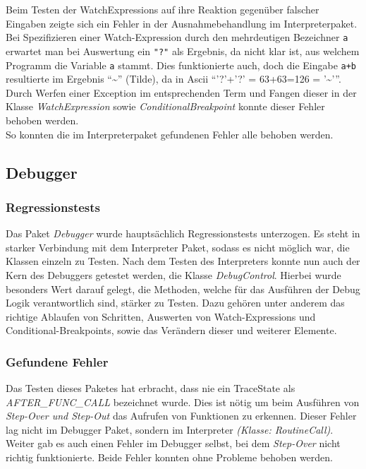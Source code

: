 \documentclass[parskip=full]{scrartcl}
\begin{document}
Beim Testen der WatchExpressions auf ihre Reaktion gegenüber falscher Eingaben zeigte sich ein Fehler in der Ausnahmebehandlung im Interpreterpaket. Bei Spezifizieren einer Watch-Expression durch den mehrdeutigen Bezeichner \texttt{a} erwartet man bei Auswertung ein \texttt{"?"} als Ergebnis, da nicht klar ist, aus welchem Programm die Variable \texttt{a} stammt. Dies funktionierte auch, doch die Eingabe \texttt{a+b} resultierte im Ergebnis \enquote{\~{}} (Tilde), da in Ascii \enquote{'?'+'?' = 63+63=126 = '\~{}'}.
Durch Werfen einer Exception im entsprechenden Term und Fangen dieser in der Klasse \textit{WatchExpression} sowie \textit{ConditionalBreakpoint} konnte dieser Fehler behoben werden.
\\
So konnten die im Interpreterpaket gefundenen Fehler alle behoben werden.

\subsection{Debugger}
\subsubsection{Regressionstests}
Das Paket \textit{Debugger} wurde hauptsächlich Regressionstests unterzogen. Es steht in starker Verbindung mit dem Interpreter Paket, sodass es nicht möglich war, die Klassen einzeln zu Testen. Nach dem Testen des Interpreters konnte nun auch der Kern des Debuggers getestet werden, die Klasse \textit{DebugControl}. Hierbei wurde besonders Wert darauf gelegt, die Methoden, welche für das Ausführen der Debug Logik verantwortlich sind, stärker zu Testen. Dazu gehören unter anderem das richtige Ablaufen von Schritten, Auswerten von Watch-Expressions und Conditional-Breakpoints, sowie das Verändern dieser und weiterer Elemente.

\subsubsection{Gefundene Fehler}
Das Testen dieses Paketes hat erbracht, dass nie ein TraceState als \textit{AFTER\_FUNC\_CALL} bezeichnet wurde. Dies ist nötig um beim Ausführen von \textit{Step-Over und Step-Out} das Aufrufen von Funktionen zu erkennen. Dieser Fehler lag nicht im Debugger Paket, sondern im Interpreter \textit{(Klasse: RoutineCall)}. Weiter gab es auch einen Fehler im Debugger selbst, bei dem \textit{Step-Over} nicht richtig funktionierte. Beide Fehler konnten ohne Probleme behoben werden.
\end{document}
